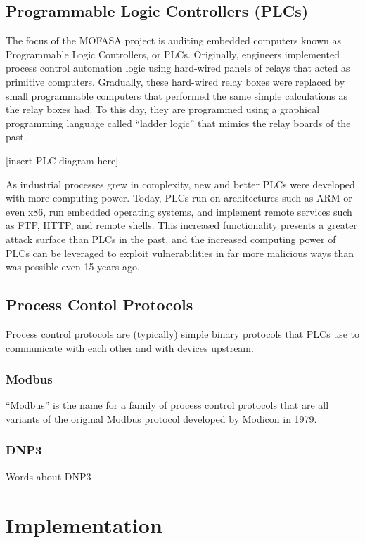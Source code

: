 \documentclass{report}
\begin{document}
\section{Programmable Logic Controllers (PLCs)}

The focus of the MOFASA project is auditing embedded computers known as Programmable Logic Controllers, or PLCs.
Originally, engineers implemented process control automation logic using hard-wired panels of relays that
acted as primitive computers. Gradually, these hard-wired relay boxes were replaced by small programmable computers
that performed the same simple calculations as the relay boxes had. To this day, they are programmed using a 
graphical programming language called ``ladder logic'' that mimics the relay boards of the past.

[insert PLC diagram here]

As industrial processes grew in complexity, new and better PLCs were developed with more computing power. Today,
PLCs run on architectures such as ARM or even x86, run embedded operating systems, and implement remote services
such as FTP, HTTP, and remote shells. This increased functionality presents a greater attack surface than PLCs
in the past, and the increased computing power of PLCs can be leveraged to exploit vulnerabilities in far more malicious
ways than was possible even 15 years ago.

\section{Process Contol Protocols}
Process control protocols are (typically) simple binary protocols that PLCs use to communicate with each other and with
devices upstream. 

\subsection{Modbus}
``Modbus'' is the name for a family of process control protocols that are all variants of the original Modbus protocol developed
by Modicon in 1979. 
\subsection{DNP3}
Words about DNP3

\chapter{Implementation}
\end{document}
